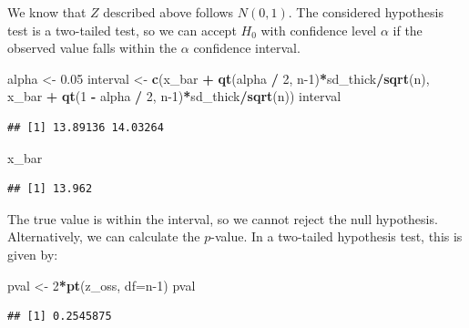 \documentclass[
]{article}
\newenvironment{Shaded}{\begin{snugshade}}{\end{snugshade}}
\newcommand{\AttributeTok}[1]{\textcolor[rgb]{0.13,0.29,0.53}{#1}}
\newcommand{\DecValTok}[1]{\textcolor[rgb]{0.00,0.00,0.81}{#1}}
\newcommand{\FloatTok}[1]{\textcolor[rgb]{0.00,0.00,0.81}{#1}}
\newcommand{\FunctionTok}[1]{\textcolor[rgb]{0.13,0.29,0.53}{\textbf{#1}}}
\newcommand{\NormalTok}[1]{#1}
\newcommand{\OtherTok}[1]{\textcolor[rgb]{0.56,0.35,0.01}{#1}}
\newcommand{\SpecialCharTok}[1]{\textcolor[rgb]{0.81,0.36,0.00}{\textbf{#1}}}
\begin{document}
We know that \(Z\) described above follows \(N(0,1)\). The considered
hypothesis test is a two-tailed test, so we can accept \(H_0\) with
confidence level \(\alpha\) if the observed value falls within the
\(\alpha\) confidence interval.

\begin{Shaded}
\begin{Highlighting}[]
\NormalTok{alpha }\OtherTok{\textless{}{-}} \FloatTok{0.05}
\NormalTok{interval }\OtherTok{\textless{}{-}} \FunctionTok{c}\NormalTok{(x\_bar }\SpecialCharTok{+} \FunctionTok{qt}\NormalTok{(alpha }\SpecialCharTok{/} \DecValTok{2}\NormalTok{, n}\DecValTok{{-}1}\NormalTok{)}\SpecialCharTok{*}\NormalTok{sd\_thick}\SpecialCharTok{/}\FunctionTok{sqrt}\NormalTok{(n), x\_bar }\SpecialCharTok{+} \FunctionTok{qt}\NormalTok{(}\DecValTok{1} \SpecialCharTok{{-}}\NormalTok{ alpha }\SpecialCharTok{/} \DecValTok{2}\NormalTok{, n}\DecValTok{{-}1}\NormalTok{)}\SpecialCharTok{*}\NormalTok{sd\_thick}\SpecialCharTok{/}\FunctionTok{sqrt}\NormalTok{(n))}
\NormalTok{interval}
\end{Highlighting}
\end{Shaded}

\begin{verbatim}
## [1] 13.89136 14.03264
\end{verbatim}

\begin{Shaded}
\begin{Highlighting}[]
\NormalTok{x\_bar}
\end{Highlighting}
\end{Shaded}

\begin{verbatim}
## [1] 13.962
\end{verbatim}

The true value is within the interval, so we cannot reject the null
hypothesis. Alternatively, we can calculate the \(p\)-value. In a
two-tailed hypothesis test, this is given by:

\begin{Shaded}
\begin{Highlighting}[]
\NormalTok{pval }\OtherTok{\textless{}{-}} \DecValTok{2}\SpecialCharTok{*}\FunctionTok{pt}\NormalTok{(z\_oss, }\AttributeTok{df=}\NormalTok{n}\DecValTok{{-}1}\NormalTok{)}
\NormalTok{pval}
\end{Highlighting}
\end{Shaded}

\begin{verbatim}
## [1] 0.2545875
\end{verbatim}
\end{document}
